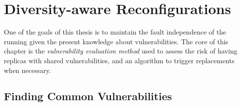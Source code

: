 \section{Diversity-aware Reconfigurations}
\label{sec:metric}

One of the goals of this thesis is to maintain the fault independence of the running \ES given the present knowledge about vulnerabilities.
The core of this chapter is the \emph{vulnerability evaluation method} used to assess the risk of having replicas with shared vulnerabilities, and an algorithm to trigger replacements when necessary.

\subsection{Finding Common Vulnerabilities}
\label{sec:common_vulnerabilities}


